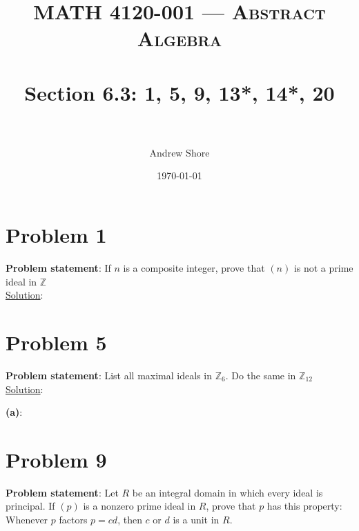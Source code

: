 \documentclass{article} %
\title{ 
\normalfont \normalsize 
\textsc{MATH 4120-001 --- Abstract Algebra} \\
\horrule{0.5pt} \\[0cm] %
\huge Section 6.3: 1, 5, 9, 13*, 14*, 20 \\ %
\horrule{2pt} \\[0cm] %
}
\author{Andrew Shore} %
\date{\normalsize\today} %
\begin{document}
\maketitle %

\section*{Problem 1}


\textbf{Problem statement}: If $n$ is a composite integer, prove that $(n)$ is not a prime ideal in $\mathbb{Z}$
\\

\underline{Solution}: 
\begin{addmargin}[1em]{0em}

\end{addmargin}    

\newpage

\section*{Problem 5}

\textbf{Problem statement}: List all maximal ideals in $\mathbb{Z}_6$.  Do the same in $\mathbb{Z}_{12}$
\\

\underline{Solution}: 
\begin{addmargin}[1em]{0em}
\textbf{(a)}:
\begin{addmargin}[1em]{0em}
\end{addmargin}
\end{addmargin}

\newpage

\section*{Problem 9}


\textbf{Problem statement}: Let $R$ be an integral domain in which every ideal is principal.  If $(p)$ is a nonzero prime ideal in $R$, prove that $p$ has this property: Whenever $p$ factors $p = cd$, then $c$ or $d$ is a unit in $R$.
\\
\end{document}
